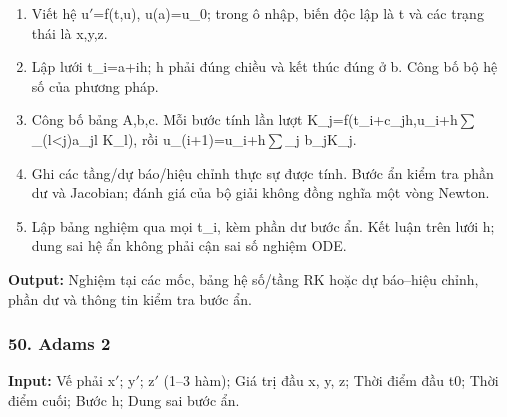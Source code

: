 \begin{enumerate}

\item Viết hệ u\ensuremath{\prime}=\allowbreak{}f(\allowbreak{}t,\allowbreak{}u),\allowbreak{} u(\allowbreak{}a)=\allowbreak{}u\_0;\allowbreak{} trong ô nhập,\allowbreak{} biến độc lập là t và các trạng thái là x,\allowbreak{}y,\allowbreak{}z.

\item Lập lưới t\_i=\allowbreak{}a+\allowbreak{}ih;\allowbreak{} h phải đúng chiều và kết thúc đúng ở b. Công bố bộ hệ số của phương pháp.

\item Công bố bảng A,\allowbreak{}b,\allowbreak{}c. Mỗi bước tính lần lượt K\_j=\allowbreak{}f(\allowbreak{}t\_i+\allowbreak{}c\_jh,\allowbreak{}u\_i+\allowbreak{}h\ensuremath{\sum}\_(\allowbreak{}l<j)a\_jl K\_l),\allowbreak{} rồi u\_(\allowbreak{}i+\allowbreak{}1)=\allowbreak{}u\_i+\allowbreak{}h\ensuremath{\sum}\_j b\_jK\_j.

\item Ghi các tầng/\allowbreak{}dự báo/\allowbreak{}hiệu chỉnh thực sự được tính. Bước ẩn kiểm tra phần dư và Jacobian;\allowbreak{} đánh giá của bộ giải không đồng nghĩa một vòng Newton.

\item Lập bảng nghiệm qua mọi t\_i,\allowbreak{} kèm phần dư bước ẩn. Kết luận trên lưới h;\allowbreak{} dung sai hệ ẩn không phải cận sai số nghiệm ODE.

\end{enumerate}

\textbf{Output:} Nghiệm tại các mốc,\allowbreak{} bảng hệ số/\allowbreak{}tầng RK hoặc dự báo–hiệu chỉnh,\allowbreak{} phần dư và thông tin kiểm tra bước ẩn.

\examplebreak\subsubsection*{50. Adams 2}

\textbf{Input:} Vế phải x\ensuremath{\prime};\allowbreak{} y\ensuremath{\prime};\allowbreak{} z\ensuremath{\prime} (\allowbreak{}1–3 hàm);\allowbreak{} Giá trị đầu x,\allowbreak{} y,\allowbreak{} z;\allowbreak{} Thời điểm đầu t0;\allowbreak{} Thời điểm cuối;\allowbreak{} Bước h;\allowbreak{} Dung sai bước ẩn.

